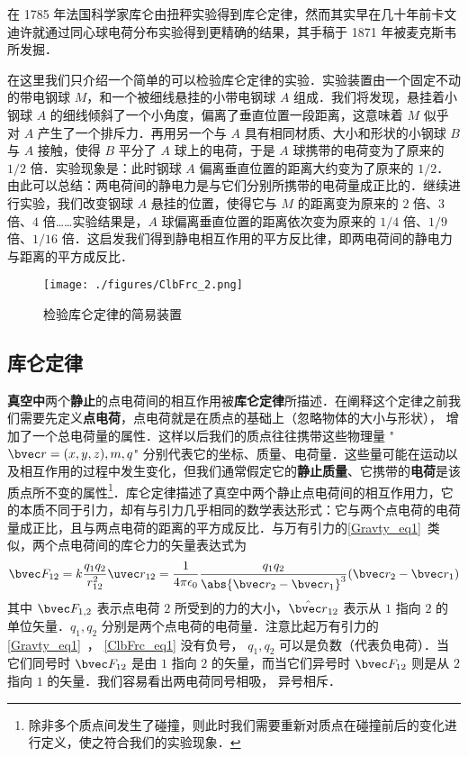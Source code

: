 

在 1785 年法国科学家库仑由扭秤实验得到库仑定律，然而其实早在几十年前卡文迪许就通过同心球电荷分布实验得到更精确的结果，其手稿于 1871 年被麦克斯韦所发掘．

在这里我们只介绍一个简单的可以检验库仑定律的实验．实验装置由一个固定不动的带电钢球 $M$，和一个被细线悬挂的小带电钢球 $A$ 组成．我们将发现，悬挂着小钢球 $A$ 的细线倾斜了一个小角度，偏离了垂直位置一段距离，这意味着 $M$ 似乎对 $A$ 产生了一个排斥力．再用另一个与 $A$ 具有相同材质、大小和形状的小钢球 $B$ 与 $A$ 接触，使得 $B$ 平分了 $A$ 球上的电荷，于是 $A$ 球携带的电荷变为了原来的 $1/2$ 倍．实验现象是：此时钢球 $A$ 偏离垂直位置的距离大约变为了原来的 $1/2$．由此可以总结：两电荷间的静电力是与它们分别所携带的电荷量成正比的．继续进行实验，我们改变钢球 $A$ 悬挂的位置，使得它与 $M$ 的距离变为原来的 $2$ 倍、$3$ 倍、$4$ 倍……实验结果是，$A$ 球偏离垂直位置的距离依次变为原来的 $1/4$ 倍、$1/9$ 倍、$1/16$ 倍．这启发我们得到静电相互作用的平方反比律，即两电荷间的静电力与距离的平方成反比．
\begin{figure}[ht]
\centering
\texttt{[image: ./figures/ClbFrc\_2.png]}
\caption{检验库仑定律的简易装置} \label{ClbFrc_fig1}
\end{figure}


\subsection{库仑定律}
\textbf{真空中}两个\textbf{静止}的点电荷间的相互作用被\textbf{库仑定律}所描述．在阐释这个定律之前我们需要先定义\textbf{点电荷}，点电荷就是在质点的基础上（忽略物体的大小与形状）， 增加了一个总电荷量的属性．这样以后我们的质点往往携带这些物理量 "$\bvec r=(x,y,z),m,q$" 分别代表它的坐标、质量、电荷量．这些量可能在运动以及相互作用的过程中发生变化，但我们通常假定它的\textbf{静止质量}、它携带的\textbf{电荷}是该质点所不变的属性\footnote{除非多个质点间发生了碰撞，则此时我们需要重新对质点在碰撞前后的变化进行定义，使之符合我们的实验现象．}．库仑定律描述了真空中两个静止点电荷间的相互作用力，它的本质不同于引力，却有与引力几乎相同的数学表达形式：它与两个点电荷的电荷量成正比，且与两点电荷的距离的平方成反比．与万有引力的\autoref{Gravty_eq1}~类似，两个点电荷间的库仑力的矢量表达式为
\begin{equation}\label{ClbFrc_eq1}
\bvec F_{12} = k\frac{q_1 q_2}{r_{12}^2} \uvec r_{12} = \frac{1}{4\pi\epsilon_0} \frac{q_1 q_2}{\abs{\bvec r_2 - \bvec r_1}^3}(\bvec r_2 - \bvec r_1)
\end{equation}
其中 $\bvec F_{1,2}$ 表示点电荷 $2$ 所受到的力的大小，$\hat{\bvec r}_{12}$ 表示从 $1$ 指向 $2$ 的单位矢量．$q_1, q_2$ 分别是两个点电荷的电荷量．注意比起万有引力的\autoref{Gravty_eq1}~， \autoref{ClbFrc_eq1} 没有负号， $q_1, q_2$ 可以是负数（代表负电荷）．当它们同号时 $\bvec F_{12}$ 是由 $1$ 指向 $2$ 的矢量，而当它们异号时 $\bvec F_{12}$ 则是从 $2$ 指向 $1$ 的矢量．我们容易看出两电荷同号相吸， 异号相斥．

